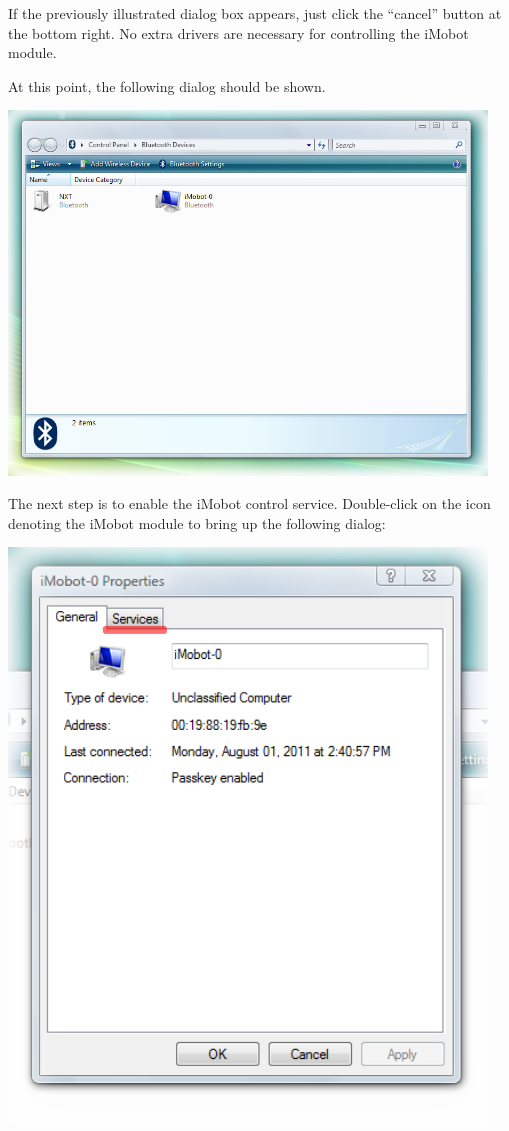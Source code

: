 \documentclass[11pt]{report}
\begin{document}
If the previously illustrated dialog box appears, just click the ``cancel''
button at the bottom right. No extra drivers are necessary for controlling the
iMobot module.

At this point, the following dialog should be shown.

\begin{center}
\includegraphics[width=5in]{images/imobot_connect_6.png}
\end{center}

The next step is to enable the iMobot control service. 
Double-click on the icon denoting the
iMobot module to bring up the following dialog:

\begin{center}
\includegraphics[width=5in]{images/imobot_connect_7.png}
\end{center}
\end{document}
